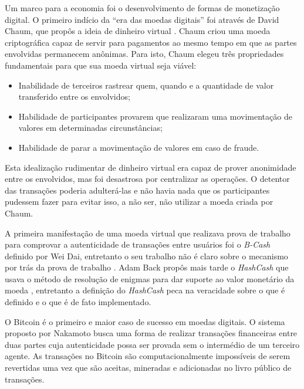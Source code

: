 \documentclass[tcc,capa]{texufpel}
\begin{document}

    Um marco para a economia foi o desenvolvimento de formas de monetização digital. O primeiro indício da ``era das moedas digitais''  foi através de David Chaum, que propôs a ideia de dinheiro virtual \cite{chaum1983blind}. Chaum criou uma moeda criptográfica capaz de servir para pagamentos ao mesmo tempo em que as partes envolvidas permanecem anônimas. Para isto, Chaum elegeu três propriedades fundamentais para que sua moeda virtual seja viável: 
	
	\begin{itemize}
	    \item Inabilidade de terceiros rastrear quem, quando e a quantidade de valor transferido entre os envolvidos;
	    \item Habilidade de participantes provarem que realizaram uma movimentação de valores em determinadas circunstâncias;
	    \item Habilidade de parar a movimentação de valores em caso de fraude.
	\end{itemize}
	
	Esta idealização rudimentar de dinheiro virtual era capaz de prover anonimidade entre os envolvidos, mas foi desastrosa por centralizar as operações. O detentor das transações poderia adulterá-las e não havia nada que os participantes pudessem fazer para evitar isso, a não ser, não utilizar a moeda criada por Chaum.
	
	A primeira manifestação de uma moeda virtual que realizava prova de trabalho para comprovar a autenticidade de transações entre usuários foi o \textit{B-Cash} definido por Wei Dai, entretanto o seu trabalho não é claro sobre o mecanismo por trás da prova de trabalho \cite{buterin2014next}. Adam Back propôs mais tarde o \textit{HashCash} que usava o método de resolução de enigmas para dar suporte ao valor monetário da moeda \cite{back2002hashcash}, entretanto a definição do \textit{HashCash} peca na veracidade sobre o que é definido e o que é de fato implementado.
	
	O Bitcoin é o primeiro e maior caso de sucesso em moedas digitais. O sistema proposto por Nakamoto \citeyearpar{nakamoto2008bitcoin} busca uma forma de realizar transações financeiras entre duas partes cuja autenticidade possa ser provada sem o intermédio de um terceiro agente. As transações no Bitcoin são computacionalmente impossíveis de serem revertidas uma vez que são aceitas, mineradas e adicionadas no livro público de transações.
	
\end{document}
